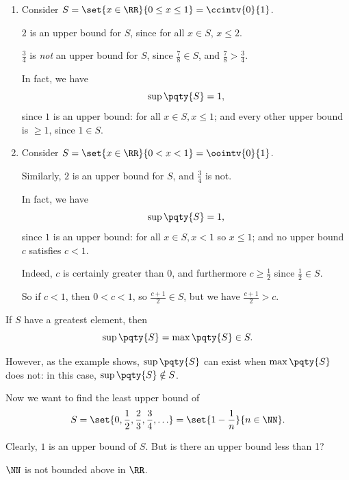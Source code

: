 \begin{examples}
    \begin{enumerate}
        \item Consider \(S = \set{x \in \RR}{0 \leq x \leq 1} = \ccintv{0}{1}\).
        
        \(2\) is an upper bound for \(S\), since for all \(x \in S\), \(x \leq 2\).

        \(\frac{3}{4}\) is \emph{not} an upper bound for \(S\), since \(\frac{7}{8} \in S\), and \(\frac{7}{8} > \frac{3}{4}\).

        In fact, we have
        \[
            \sup \pqty{S} = 1,
        \]
        since \(1\) is an upper bound: for all \(x \in S, x \leq 1\); and every other upper bound is \(\geq 1\), since \(1 \in S\).

        \item Consider \(S = \set{x \in \RR}{0 < x < 1} = \oointv{0}{1}\).
        
        Similarly, \(2\) is an upper bound for \(S\), and \(\frac{3}{4}\) is not.

        In fact, we have
        \[
            \sup \pqty{S} = 1,
        \]
        since \(1\) is an upper bound: for all \(x \in S, x < 1\) so \(x \leq 1\); and no upper bound \(c\) satisfies \(c < 1\).

        Indeed, \(c\) is certainly greater than \(0\), and furthermore \(c \geq \frac{1}{2}\) since \(\frac{1}{2} \in S\).

        So if \(c < 1\), then \(0 < c < 1\), so \(\frac{c + 1}{2} \in S\), but we have \(\frac{c + 1}{2} > c\).
    \end{enumerate}
\end{examples}

\begin{remark}
    If \(S\) have a greatest element, then
    \[
        \sup \pqty{S} = \max \pqty{S} \in S.
    \]

    However, as the example shows, \(\sup\pqty{S}\) can exist when \(\max\pqty{S}\) does not: in this case, \(\sup\pqty{S} \notin S\).
\end{remark}

Now we want to find the least upper bound of
\[
    S = \set{0, \frac{1}{2}, \frac{2}{3}, \frac{3}{4}, \ldots} = \set{1 - \frac{1}{n}}{n \in \NN}.
\]

Clearly, \(1\) is an upper bound of \(S\). But is there an upper bound less than 1?

\begin{proposition}
    \(\NN\) is not bounded above in \(\RR\).
\end{proposition}

